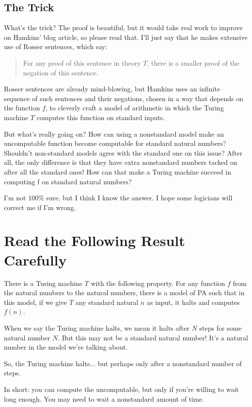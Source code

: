 \documentclass{article}
\begin{document}
\subsection*{The Trick}
What’s the trick? The proof is beautiful, but it would take real work to improve on Hamkins’ blog article, so please read that. I’ll just say that he makes extensive use of Rosser sentences, which say:

\blockquote{For any proof of this sentence in theory $T$, there is a smaller proof of the negation of this sentence.}

Rosser sentences are already mind-blowing, but Hamkins uses an infinite sequence of such sentences and their negations, chosen in a way that depends on the function $f$, to cleverly craft a model of arithmetic in which the Turing machine $T$ computes this function on standard inputs.

But what’s really going on? How can using a nonstandard model make an uncomputable function become computable for standard natural numbers? Shouldn’t non-standard models agree with the standard one on this issue? After all, the only difference is that they have extra nonstandard numbers tacked on after all the standard ones! How can that make a Turing machine succeed in computing f on standard natural numbers?

I’m not 100\% sure, but I think I know the answer. I hope some logicians will correct me if I’m wrong.

\section*{Read the Following Result Carefully}

There is a Turing machine $T$ with the following property. For any function $f$ from the natural numbers to the natural numbers, there is a model of PA such that in this model, if we give $T$ any standard natural $n$ as input, it halts and computes $f(n)$.

When we say the Turing machine halts, we mean it halts after $N$ steps for some natural number $N$. But this may not be a standard natural number! It’s a natural number in the model we’re talking about.

So, the Turing machine halts... but perhaps only after a nonstandard number of steps.

In short: you can compute the uncomputable, but only if you’re willing to wait long enough. You may need to wait a nonstandard amount of time.
\end{document}
